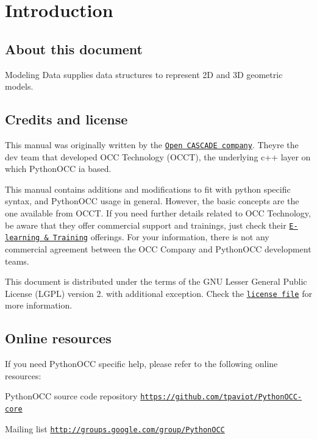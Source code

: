 \hypertarget{occt_user_guides__modeling_data_occt_modat_0}{}\section{Introduction}\label{occt_user_guides__modeling_data_occt_modat_0}
\hypertarget{occt_user_guides__modeling_data_label_about}{}\subsection{About this document}\label{occt_user_guides__modeling_data_label_about}
Modeling Data supplies data structures to represent 2D and 3D geometric models.\hypertarget{occt_user_guides__modeling_data_label_credits}{}\subsection{Credits and license}\label{occt_user_guides__modeling_data_label_credits}
This manual was originally written by the \href{http://www.opencascade.com}{\tt Open C\+A\+S\+C\+A\+DE company}. They\textquotesingle{}re the dev team that developed O\+CC Technology (O\+C\+CT), the underlying c++ layer on which Python\+O\+CC ia based.

This manual contains additions and modifications to fit with python specific syntax, and Python\+O\+CC usage in general. However, the basic concepts are the one available from O\+C\+CT. If you need further details related to O\+CC Technology, be aware that they offer commercial support and trainings, just check their \href{http://www.opencascade.com/content/tutorial-learning}{\tt E-\/learning \& Training} offerings. For your information, there is not any commercial agreement between the O\+CC Company and Python\+O\+CC development teams.

This document is distributed under the terms of the G\+NU Lesser General Public License (L\+G\+PL) version 2. with additional exception. Check the \href{https://github.com/tpaviot/PythonOCC-documentation/upstream_doc/LICENCES.md}{\tt license file} for more information.\hypertarget{occt_user_guides__modeling_data_label_resources}{}\subsection{Online resources}\label{occt_user_guides__modeling_data_label_resources}
If you need Python\+O\+CC specific help, please refer to the following online resources\+:


\begin{DoxyItemize}
\item Python\+O\+CC source code repository \href{https://github.com/tpaviot/PythonOCC-core}{\tt https\+://github.\+com/tpaviot/\+Python\+O\+C\+C-\/core}
\item Mailing list \href{http://groups.google.com/group/PythonOCC}{\tt http\+://groups.\+google.\+com/group/\+Python\+O\+CC}
\end{DoxyItemize}

